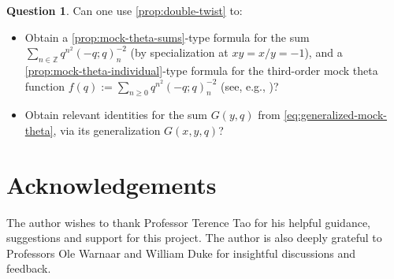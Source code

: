 \documentclass[reqno,11pt]{amsart}
\theoremstyle{definition}
\newtheorem{question}{Question}
\theoremstyle{remark}
\numberwithin{equation}{section}
\newcommand{\Z}{\mathbb{Z}}
\begin{document}
\begin{question} \label{qtn:double-twist}
Can one use \cref{prop:double-twist} to:
\begin{itemize}
    \item[(i).] Obtain a \cref{prop:mock-theta-sums}-type formula for the sum $\sum_{n \in \Z} q^{n^2} (-q; q)_n^{-2}$ (by specialization at $xy = x/y = -1$), and a \cref{prop:mock-theta-individual}-type formula for the third-order mock theta function $f(q) := \sum_{n \ge 0} q^{n^2} (-q; q)_n^{-2}$ (see, e.g., \cite{chen2012partition})?
    \item[(ii).] Obtain relevant identities for the sum $G(y, q)$ from \cref{eq:generalized-mock-theta}, via its generalization $G(x, y, q)$?
\end{itemize}
\end{question}

\section*{Acknowledgements}

The author wishes to thank Professor Terence Tao for his helpful guidance, suggestions and support for this project. The author is also deeply grateful to Professors Ole Warnaar and William Duke for insightful discussions and feedback.

\end{document}
